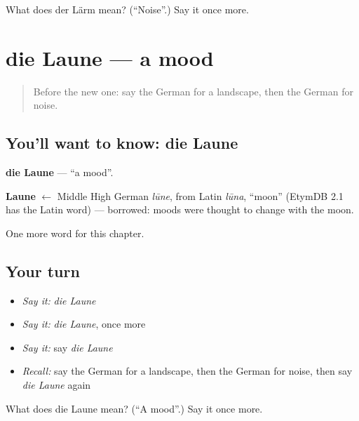 \begin{tcolorbox}[breakable,colback=teal!4,colframe=teal!35!black,title={Before you move on}]
What does der Lärm mean? (\textquotedblleft{}Noise\textquotedblright{}.) Say it once more.
\end{tcolorbox}
\section[die Laune]{die Laune — a mood}

\label{lesson:GE-C233-laune}



\begin{quote}
Before the new one: say the German for a landscape, then the German for noise.
\end{quote}

\subsection*{You'll want to know: die Laune}
\textbf{die Laune} — \textquotedblleft{}a mood\textquotedblright{}.

\begin{cousinweb}
\textbf{Laune} $\leftarrow$ Middle High German \emph{lūne}, from Latin \emph{lūna}, \textquotedblleft{}moon\textquotedblright{} (EtymDB 2.1 has the Latin word) — borrowed: moods were thought to change with the moon.
\end{cousinweb}

\begin{grammarlens}[title={What you've built}]
One more word for this chapter.
\end{grammarlens}

\subsection*{Your turn}
\begin{itemize}
\raggedright
  \item \emph{Say it:} \emph{die Laune}
  \item \emph{Say it:} \emph{die Laune}, once more
  \item \emph{Say it:} say \emph{die Laune}
  \item \emph{Recall:} say the German for a landscape, then the German for noise, then say \emph{die Laune} again
\end{itemize}

\begin{tcolorbox}[breakable,colback=teal!4,colframe=teal!35!black,title={Before you move on}]
What does die Laune mean? (\textquotedblleft{}A mood\textquotedblright{}.) Say it once more.
\end{tcolorbox}

